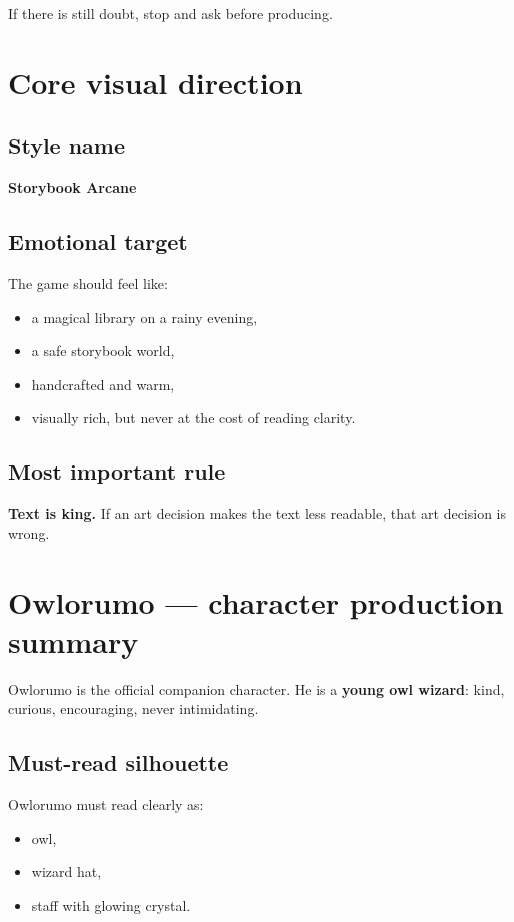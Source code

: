 \documentclass[11pt,a4paper]{article}
\begin{document}
If there is still doubt, stop and ask before producing.

\section{Core visual direction}

\subsection{Style name}
\textbf{Storybook Arcane}

\subsection{Emotional target}
The game should feel like:
\begin{itemize}
  \item a magical library on a rainy evening,
  \item a safe storybook world,
  \item handcrafted and warm,
  \item visually rich, but never at the cost of reading clarity.
\end{itemize}

\subsection{Most important rule}
\textbf{Text is king.} If an art decision makes the text less readable, that art decision is wrong.

\section{Owlorumo — character production summary}

Owlorumo is the official companion character. He is a \textbf{young owl wizard}: kind, curious, encouraging, never intimidating.

\subsection{Must-read silhouette}
Owlorumo must read clearly as:
\begin{itemize}
  \item owl,
  \item wizard hat,
  \item staff with glowing crystal.
\end{itemize}
\end{document}
